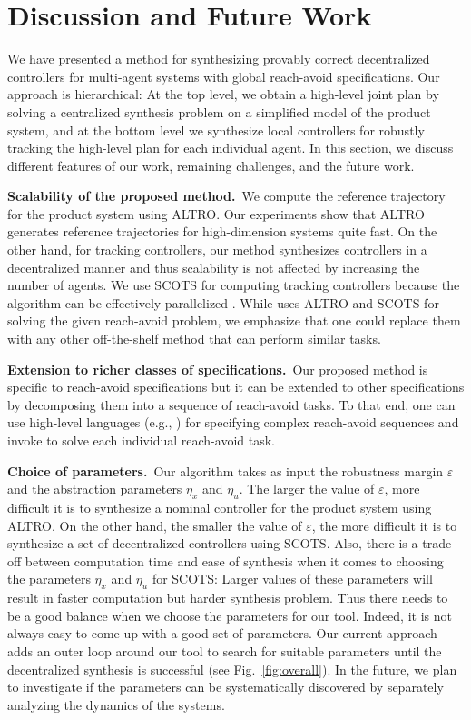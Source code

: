 \section{Discussion and Future Work}
We have presented a method for synthesizing provably correct decentralized controllers for multi-agent systems with global reach-avoid specifications. 
Our approach is hierarchical: At the top level, we obtain a high-level joint plan by solving a centralized synthesis problem on a simplified model of the product system, and at the bottom level we synthesize local controllers for robustly tracking the high-level plan for each individual agent.
In this section, we discuss different features of our work, remaining challenges, and the future work.

\smallskip
\noindent\textbf{Scalability of the proposed method.}\
We compute the reference trajectory for the product system using ALTRO. Our experiments show that ALTRO generates reference trajectories for high-dimension systems quite fast. On the other hand, for tracking controllers, our method synthesizes controllers in a decentralized manner and thus scalability is not affected by increasing the number of agents. We use SCOTS for computing tracking controllers because the algorithm can be effectively parallelized \cite{KhaledZ19pfaces}. While \tool uses ALTRO and SCOTS for solving the given reach-avoid problem, we emphasize that one could replace them with any other off-the-shelf method that can perform similar tasks.

\smallskip
\noindent\textbf{Extension to richer classes of specifications.}\
Our proposed method is specific to reach-avoid specifications but it can be extended to other specifications by decomposing them into a sequence of reach-avoid tasks. To that end, one can use high-level languages (e.g., \cite{Majumdar2020,Ghosh2020}) for specifying complex reach-avoid sequences and invoke \tool to solve each individual reach-avoid task.

\smallskip
\noindent\textbf{Choice of parameters.}\
Our algorithm takes as input the robustness margin $\varepsilon$ and the abstraction parameters $\eta_x$ and $\eta_u$.
The larger the value of $\varepsilon$, more difficult it is to synthesize a nominal controller for the product system using ALTRO.
On the other hand, the smaller the value of $\varepsilon$, the more difficult it is to synthesize a set of decentralized controllers using SCOTS.
Also, there is a trade-off between computation time and ease of synthesis when it comes to choosing the parameters $\eta_x$ and $\eta_u$ for SCOTS: Larger values of these parameters will result in faster computation but harder synthesis problem.
Thus there needs to be a good balance when we choose the parameters for our tool.
Indeed, it is not always easy to come up with a good set of parameters.
Our current approach adds an outer loop around our tool to search for suitable parameters until the decentralized synthesis is successful (see Fig.~\ref{fig:overall}).
In the future, we plan to investigate if the parameters can be systematically discovered by separately analyzing the dynamics of the systems.

